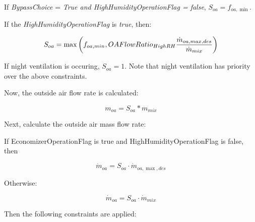 If \emph{BypassChoice} = \emph{True and HighHumidityOperationFlag = false}, \({S_{oa}} = {f_{oa,\min }}\).

If the \emph{HighHumidityOperationFlag} is \emph{true}, then:

\begin{equation}
  S_{oa} = \max\left(f_{oa,min},OAFlowRatio_{HighRH}\frac{\dot{m}_{oa,max,des}}{\dot{m}_{mix}}\right)
\end{equation}

If night ventilation is occuring, \({S_{oa}} = 1\).  Note that night ventilation has priority over the above constraints.

Now, the outside air flow rate is calculated:

\begin{equation}
{m_{oa}} = {S_{oa}}*{m_{mix}}
\end{equation}

Next, calculate the outside air mass flow rate:

If EconomizerOperationFlag is true and HighHumidityOperationFlag is false, then

\begin{equation}
{\dot m_{oa}} = {S_{oa}}\cdot {\dot m_{oa,\max ,des}}
\end{equation}

Otherwise:

\begin{equation}
{\dot m_{oa}} = {S_{oa}}\cdot {\dot m_{mix}}
\end{equation}

Then the following constraints are applied:

